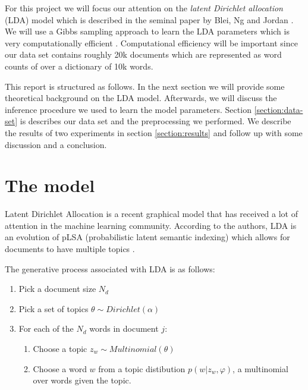 \documentclass[11pt]{article}
\begin{document}
    For this project we will focus our attention on the \emph{latent Dirichlet allocation} (LDA) model
    which is described in the seminal paper by Blei, Ng and Jordan \cite{Blei2003}. 
    We will use a Gibbs sampling approach to learn the LDA parameters which is very computationally
    efficient \cite{griffiths2004finding}. 
    Computational efficiency will be important since our data set contains roughly 20k documents  
    which are represented as word counts of over a dictionary of 10k words.
    
    This report is structured as follows.
    In the next section we will provide some theoretical background on the LDA model.
    Afterwards, we will discuss the inference procedure we used to learn the model parameters.
    Section \ref{section:data-set} is describes our data set and the preprocessing we performed.
    We describe the results of two experiments in section \ref{section:results} and follow up
    with some discussion and a conclusion.



\section{The model}

    Latent Dirichlet Allocation is a recent graphical model that has received a lot of attention in 
    the machine learning community.  
    According to the authors, LDA is an evolution of pLSA (probabilistic latent semantic indexing) 
    which allows for documents to have multiple topics \cite{Blei2003}.
    
    The generative process associated with LDA is as follows:
    \begin{enumerate}
        \item   Pick a document size $N_d$
        \item   Pick a set of topics $\theta  \sim Dirichlet(\alpha)$
        \item   For each of the $N_d$ words in document $j$:
                \begin{enumerate}
                \item Choose a topic $z_{w} \sim Multinomial(\theta)$
                \item Choose a word $w$ from a topic distibution $p(w|z_w, \varphi)$, a multinomial over words given the topic.
                \end{enumerate}
    \end{enumerate}
\end{document}
